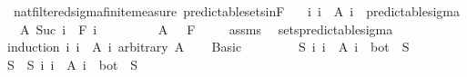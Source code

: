\begin{isabellebody}
\isanewline
{}\isamarkupfalse%
\ {\isacharparenleft}{\kern0pt}\ nat{\isacharunderscore}{\kern0pt}filtered{\isacharunderscore}{\kern0pt}sigma{\isacharunderscore}{\kern0pt}finite{\isacharunderscore}{\kern0pt}measure{\isacharparenright}{\kern0pt}\ predictable{\isacharunderscore}{\kern0pt}sets{\isacharunderscore}{\kern0pt}in{\isacharunderscore}{\kern0pt}F{\isacharcolon}{\kern0pt}\isanewline
\ \ \ {\isachardoublequoteopen}{\isacharparenleft}{\kern0pt}{\isasymUnion}i{\isachardot}{\kern0pt}\ {\isacharbraceleft}{\kern0pt}i{\isacharbraceright}{\kern0pt}\ {\isasymtimes}\ A\ i{\isacharparenright}{\kern0pt}\ {\isasymin}\ predictable{\isacharunderscore}{\kern0pt}sigma{\isachardoublequoteclose}\isanewline
\ \ \ {\isachardoublequoteopen}A\ {\isacharparenleft}{\kern0pt}Suc\ i{\isacharparenright}{\kern0pt}\ {\isasymin}\ F\ i{\isachardoublequoteclose}\ \isanewline
\ \ \ \ \ \ \ \ {\isachardoublequoteopen}A\ {}\ {\isasymin}\ F\ {}{\isachardoublequoteclose}\isanewline
%
\isadelimproof
\ \ %
\endisadelimproof
%
\isatagproof
{}\isamarkupfalse%
\ assms\ \isamarkupfalse%
\ sets{\isacharunderscore}{\kern0pt}predictable{\isacharunderscore}{\kern0pt}sigma\isanewline
{}\isamarkupfalse%
\ {\isacharparenleft}{\kern0pt}induction\ {\isachardoublequoteopen}{\isacharparenleft}{\kern0pt}{\isasymUnion}i{\isachardot}{\kern0pt}\ {\isacharbraceleft}{\kern0pt}i{\isacharbraceright}{\kern0pt}\ {\isasymtimes}\ A\ i{\isacharparenright}{\kern0pt}{\isachardoublequoteclose}\ arbitrary{\isacharcolon}{\kern0pt}\ A{\isacharparenright}{\kern0pt}\isanewline
\ \ \isamarkupfalse%
\ Basic\isanewline
\ \ \isacommand{{\isacharbraceleft}{\kern0pt}}\isamarkupfalse%
\isanewline
\ \ \ \ \isamarkupfalse%
\ {\isachardoublequoteopen}{\isasymexists}S{\isachardot}{\kern0pt}\ {\isacharparenleft}{\kern0pt}{\isasymUnion}i{\isachardot}{\kern0pt}\ {\isacharbraceleft}{\kern0pt}i{\isacharbraceright}{\kern0pt}\ {\isasymtimes}\ A\ i{\isacharparenright}{\kern0pt}\ {\isacharequal}{\kern0pt}\ {\isacharbraceleft}{\kern0pt}bot{\isacharbraceright}{\kern0pt}\ {\isasymtimes}\ S{\isachardoublequoteclose}\isanewline
\ \ \ \ \isamarkupfalse%
\ \isamarkupfalse%
\ S\ \ S{\isacharcolon}{\kern0pt}\ {\isachardoublequoteopen}{\isacharparenleft}{\kern0pt}{\isasymUnion}i{\isachardot}{\kern0pt}\ {\isacharbraceleft}{\kern0pt}i{\isacharbraceright}{\kern0pt}\ {\isasymtimes}\ A\ i{\isacharparenright}{\kern0pt}\ {\isacharequal}{\kern0pt}\ {\isacharbraceleft}{\kern0pt}bot{\isacharbraceright}{\kern0pt}\ {\isasymtimes}\ S{\isachardoublequoteclose}\ \isamarkupfalse%

\end{isabellebody}
